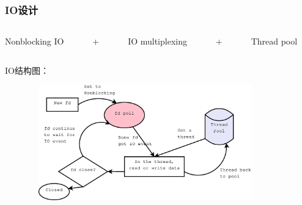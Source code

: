 \documentclass[10pt,dvipdfm]{beamer}
\begin{document}
\begin{frame}
	\frametitle{IO设计}
	\begin{columns}
		\begin{column}{0.25\textwidth}
			\begin{alertblock}{}
				Nonblocking IO
			\end{alertblock}
			
		\end{column}
		
		\begin{column}{0.02\textwidth}
			\begin{alertblock}{}
				+
			\end{alertblock}
		\end{column}
		
		\begin{column}{0.28\textwidth}
			\begin{alertblock}{}
				IO multiplexing
			\end{alertblock}
			
		\end{column}
		
		\begin{column}{0.02\textwidth}
			\begin{alertblock}{}
				+
			\end{alertblock}
		\end{column}
		
		\begin{column}{0.22\textwidth}
			\begin{alertblock}{}
				Thread pool
			\end{alertblock}
		\end{column}
	\end{columns}
	\pause
	\begin{block}{IO结构图：}
	\begin{figure}[htbp]
	\centering
	\includegraphics[height=5cm, width=10cm]{IO.eps}
	\end{figure}
	\end{block}
	
\end{frame}
\end{document}
